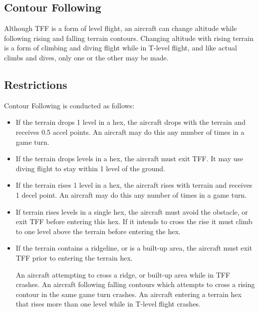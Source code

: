 \subsection{Contour Following} Although TFF is a form of level flight, an aircraft can change altitude while following rising and falling terrain contours.  Changing altitude with rising terrain is a form of climbing and diving flight while in T-level flight, and like actual climbs and dives, only one or the other may be made.

\subsection{Restrictions} Contour Following is conducted as follows:

\begin{itemize}

    \item If the terrain drops 1 level in a hex, the aircraft drops with the terrain and receives 0.5 accel points. An aircraft may do this any number of times in a game turn.

    \item If the terrain drops  levels in a hex, the aircraft must exit TFF. It may use diving flight to stay within 1 level of the ground.

    \item If the terrain rises 1 level in a hex, the aircraft rises with terrain and receives 1 decel point. An aircraft may do this any number of times in a game turn.

    \item If terrain rises  levels in a single hex, the aircraft must avoid the obstacle, or exit TFF before entering this hex. If it intends to cross the rise it must climb to one level above the terrain before entering the hex.

    \item If the terrain contains a ridgeline, or is a built-up area, the aircraft must exit TFF prior to entering the terrain hex.

        An aircraft attempting to cross a ridge, or built-up area while in TFF crashes. An aircraft following falling contours which attempts to cross a rising contour in the same game turn crashes. An aircraft entering a terrain hex that rises more than one level while in T-level flight crashes.

\end{itemize}


